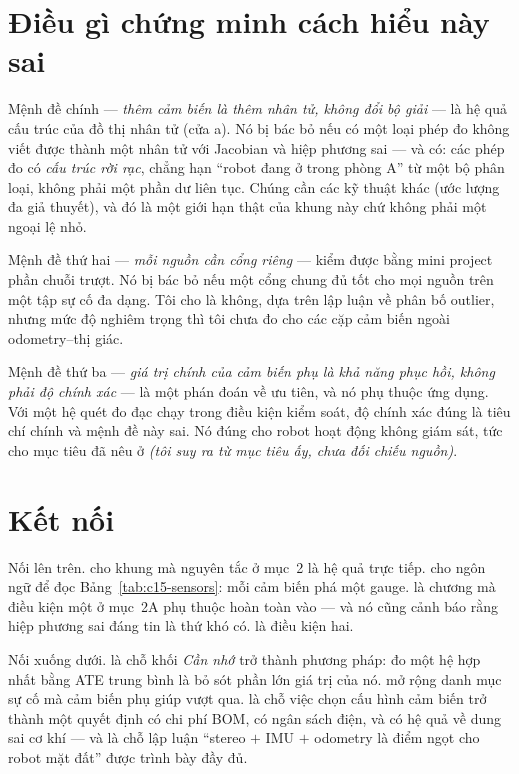 \documentclass[../../vslam.tex]{subfiles}
\begin{document}
\section{Điều gì chứng minh cách hiểu này sai}

Mệnh đề chính --- \emph{thêm cảm biến là thêm nhân tử, không đổi bộ giải} --- là hệ quả cấu trúc của đồ thị nhân tử (cửa a). Nó bị bác bỏ nếu có một loại phép đo không viết được thành một nhân tử với Jacobian và hiệp phương sai --- và có: các phép đo có \emph{cấu trúc rời rạc}, chẳng hạn ``robot đang ở trong phòng A'' từ một bộ phân loại, không phải một phần dư liên tục. Chúng cần các kỹ thuật khác (ước lượng đa giả thuyết), và đó là một giới hạn thật của khung này chứ không phải một ngoại lệ nhỏ.

Mệnh đề thứ hai --- \emph{mỗi nguồn cần cổng riêng} --- kiểm được bằng mini project phần chuỗi trượt. Nó bị bác bỏ nếu một cổng chung đủ tốt cho mọi nguồn trên một tập sự cố đa dạng. Tôi cho là không, dựa trên lập luận về phân bố outlier, nhưng mức độ nghiêm trọng thì tôi chưa đo cho các cặp cảm biến ngoài odometry--thị giác.

Mệnh đề thứ ba --- \emph{giá trị chính của cảm biến phụ là khả năng phục hồi, không phải độ chính xác} --- là một phán đoán về ưu tiên, và nó phụ thuộc ứng dụng. Với một hệ quét đo đạc chạy trong điều kiện kiểm soát, độ chính xác đúng là tiêu chí chính và mệnh đề này sai. Nó đúng cho robot hoạt động không giám sát, tức cho mục tiêu đã nêu ở  \emph{(tôi suy ra từ mục tiêu ấy, chưa đối chiếu nguồn)}.

\section{Kết nối}

Nối lên trên.  cho khung mà nguyên tắc ở mục~2 là hệ quả trực tiếp.  cho ngôn ngữ để đọc Bảng~\ref{tab:c15-sensors}: mỗi cảm biến phá một gauge.  là chương mà điều kiện một ở mục~2A phụ thuộc hoàn toàn vào --- và nó cũng cảnh báo rằng hiệp phương sai đáng tin là thứ khó có.  là điều kiện hai.

Nối xuống dưới.  là chỗ khối \emph{Cần nhớ} trở thành phương pháp: đo một hệ hợp nhất bằng ATE trung bình là bỏ sót phần lớn giá trị của nó.  mở rộng danh mục sự cố mà cảm biến phụ giúp vượt qua.  là chỗ việc chọn cấu hình cảm biến trở thành một quyết định có chi phí BOM, có ngân sách điện, và có hệ quả về dung sai cơ khí --- và là chỗ lập luận ``stereo \(+\) IMU \(+\) odometry là điểm ngọt cho robot mặt đất'' được trình bày đầy đủ.
\end{document}
